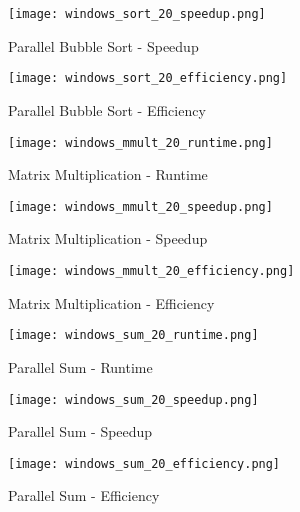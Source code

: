 \documentclass[letterpaper,12pt]{article} %
\begin{document}
\begin{figure} [H]
    \centering
          {\texttt{[image: windows\_sort\_20\_speedup.png]}}
        \caption{Parallel Bubble Sort - Speedup}
        \label{fig:arch_flow}
    \centering
\end{figure}


\begin{figure} [H]
    \centering
          {\texttt{[image: windows\_sort\_20\_efficiency.png]}}
        \caption{Parallel Bubble Sort - Efficiency}
        \label{fig:arch_flow}
    \centering
\end{figure}









\begin{figure} [H]
    \centering
          {\texttt{[image: windows\_mmult\_20\_runtime.png]}}
        \caption{Matrix Multiplication - Runtime}
        \label{fig:arch_flow}
    \centering
\end{figure}


\begin{figure} [H]
    \centering
          {\texttt{[image: windows\_mmult\_20\_speedup.png]}}
        \caption{Matrix Multiplication - Speedup}
        \label{fig:arch_flow}
    \centering
\end{figure}


\begin{figure} [H]
    \centering
          {\texttt{[image: windows\_mmult\_20\_efficiency.png]}}
        \caption{Matrix Multiplication - Efficiency}
        \label{fig:arch_flow}
    \centering
\end{figure}









\begin{figure} [H]
    \centering
          {\texttt{[image: windows\_sum\_20\_runtime.png]}}
        \caption{Parallel Sum - Runtime}
        \label{fig:arch_flow}
    \centering
\end{figure}


\begin{figure} [H]
    \centering
          {\texttt{[image: windows\_sum\_20\_speedup.png]}}
        \caption{Parallel Sum - Speedup}
        \label{fig:arch_flow}
    \centering
\end{figure}


\begin{figure} [H]
    \centering
          {\texttt{[image: windows\_sum\_20\_efficiency.png]}}
        \caption{Parallel Sum - Efficiency}
        \label{fig:arch_flow}
    \centering
\end{figure}
\end{document}
